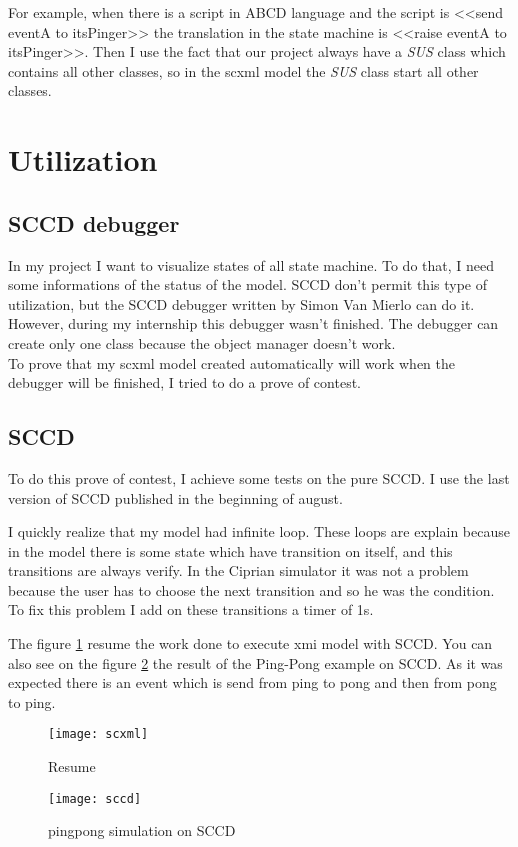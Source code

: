 For example, when there is a script in ABCD language and the script is <<send eventA to itsPinger>> the translation in the state machine is <<raise eventA to itsPinger>>. Then I use the fact that our project always have a \textit{SUS} class which contains all other classes, so in the scxml model the \textit{SUS} class start all other classes.

\section{Utilization}

\subsection{SCCD debugger}

In my project I want to visualize states of all state machine. To do that, I need some informations of the status of the model. SCCD don't permit this type of utilization, but the SCCD debugger written by Simon Van Mierlo can do it.
~\\

However, during my internship this debugger wasn't finished. The debugger can create only one class because the object manager doesn't work.
~\\

To prove that my scxml model created automatically will work when the debugger will be finished, I tried to do a prove of contest. %

\subsection{SCCD}

To do this prove of contest, I achieve some tests on the pure SCCD. I use the last version of SCCD published in the beginning of august.


I quickly realize that my model had infinite loop. These loops are explain because in the model there is some state which have transition on itself, and this transitions are always verify. In the Ciprian simulator it was not a problem because the user has to choose the next transition and so he was the condition. To fix this problem I add on these transitions a timer of 1s.

The figure \ref{fig:sccd_resume} resume the work done to execute xmi model with SCCD. You can also see on the figure \ref{fig:sccd} the result of the Ping-Pong example on SCCD. As it was expected there is an event which is send from ping to pong and then from pong to ping.
\begin{figure}[h]
  \centering
  \texttt{[image: scxml]}
  \caption{Resume}
  \label{fig:sccd_resume}
\end{figure}

\begin{figure}[h]
  \centering
  \texttt{[image: sccd]}
  \caption{pingpong simulation on SCCD}
  \label{fig:sccd}
\end{figure}


